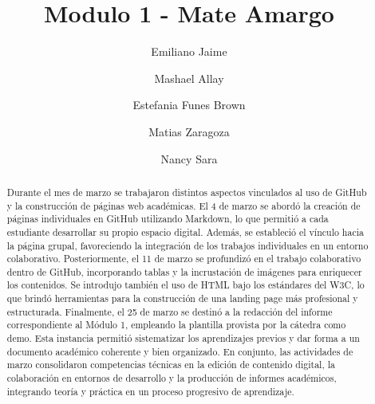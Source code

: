 \documentclass[runningheads]{llncs}
\begin{document}
%
\title{Modulo 1 - Mate Amargo}
%
%
\author{Emiliano Jaime\orcidID{} \and
Mashael Allay\orcidID{} \and
Estefania Funes Brown\orcidID{}\and
Matias Zaragoza\orcidID{}\and
Nancy Sara\orcidID{}}
%
%
\institute{Universidad Nacional de Cuyo, Instituto de Ingeniería Inndustrial POBOX 5502 %
\email{mnzargo28@gmail.com}\\
\url{http://ingenieria.uncuyo.edu.ar} %
%
}
\maketitle          %
%
\begin{abstract}
Durante el mes de marzo se trabajaron distintos aspectos vinculados al uso de GitHub y la construcción de páginas web académicas. El 4 de marzo se abordó la creación de páginas individuales en GitHub utilizando Markdown, lo que permitió a cada estudiante desarrollar su propio espacio digital. Además, se estableció el vínculo hacia la página grupal, favoreciendo la integración de los trabajos individuales en un entorno colaborativo. Posteriormente, el 11 de marzo se profundizó en el trabajo colaborativo dentro de GitHub, incorporando tablas y la incrustación de imágenes para enriquecer los contenidos. Se introdujo también el uso de HTML bajo los estándares del W3C, lo que brindó herramientas para la construcción de una landing page más profesional y estructurada. Finalmente, el 25 de marzo se destinó a la redacción del informe correspondiente al Módulo 1, empleando la plantilla provista por la cátedra como demo. Esta instancia permitió sistematizar los aprendizajes previos y dar forma a un documento académico coherente y bien organizado. En conjunto, las actividades de marzo consolidaron competencias técnicas en la edición de contenido digital, la colaboración en entornos de desarrollo y la producción de informes académicos, integrando teoría y práctica en un proceso progresivo de aprendizaje.  

\end{abstract}
%
%
%
\end{document}
